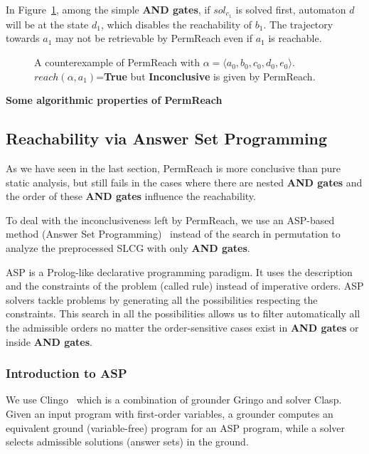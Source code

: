 \begin{example}\label{ex:counterPerm}
In Figure~\ref{FigConflictInForks}, among the simple \textbf{AND gates}, if $sol_{c_1}$ is solved first, automaton $d$ will be at the state $d_1$, which disables the reachability of $b_1$.
The trajectory towards $a_1$ may not be retrievable by PermReach even if $a_1$ is reachable.
\end{example}

\begin{figure}[ht]
\centering

\caption[Counterexample of PermReach]{A counterexample of PermReach with $\alpha=\langle a_0,b_0,c_0,d_0,e_0\rangle$. 
$reach(\alpha,a_1)$=\textbf{True} but \textbf{Inconclusive} is given by PermReach.
}\label{FigConflictInForks}
\end{figure}

\textbf{Some algorithmic properties of PermReach}

\subsection{Reachability via Answer Set Programming}

As we have seen in the last section, PermReach is more conclusive than pure static analysis, but still fails in the cases where there are nested \textbf{AND gates} and the order of these \textbf{AND gates} influence the reachability.

To deal with the inconclusiveness left by PermReach, we use an ASP-based method (Answer Set Programming)~\cite{baral2003knowledge} instead of the search in permutation to analyze the preprocessed SLCG with only \textbf{AND gates}.

ASP is a Prolog-like declarative programming paradigm.
It uses the description and the constraints of the problem (called rule) instead of imperative orders.
ASP solvers tackle problems by generating all the possibilities respecting the constraints. 
This search in all the possibilities allows us to filter automatically all the admissible orders no matter the order-sensitive cases exist in \textbf{AND gates} or inside \textbf{AND gates}.

\subsubsection{Introduction to ASP}\label{sec:introAsp}
We use Clingo~\cite{gebser2016theory} which is a combination of grounder Gringo and solver Clasp. 
Given an input program with first-order variables, a grounder computes an equivalent ground (variable-free) program for an ASP program, while a solver selects admissible solutions (answer sets) in the ground.

